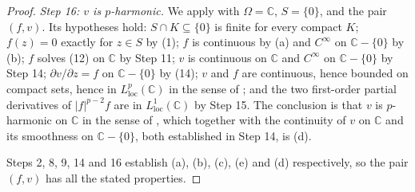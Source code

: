 \begin{proof}
\emph{Step 16: $v$ is $p$-harmonic.}  We apply 
with $\Omega=\mathbb{C}$, $S=\{0\}$, and the pair $(f,v)$.  Its hypotheses hold:
$S\cap K\subseteq\{0\}$ is finite for every compact $K$; $f(z)=0$ exactly for
$z\in S$ by (1); $f$ is continuous by (a) and $C^\infty$ on
$\mathbb{C}-\{0\}$ by (b); $f$ solves (12) on $\mathbb{C}$ by Step 11; $v$ is
continuous on $\mathbb{C}$ and $C^\infty$ on $\mathbb{C}-\{0\}$ by Step 14;
$\partial v/\partial z=f$ on $\mathbb{C}-\{0\}$ by (14); $v$ and $f$ are
continuous, hence bounded on compact sets, hence in
$L^p_{\mathrm{loc}}(\mathbb{C})$ in the sense of ; and the
two first-order partial derivatives of $|f|^{p-2}f$ are in
$L^1_{\mathrm{loc}}(\mathbb{C})$ by Step 15.  The conclusion is that $v$ is
$p$-harmonic on $\mathbb{C}$ in the sense of , which
together with the continuity of $v$ on $\mathbb{C}$ and its smoothness on
$\mathbb{C}-\{0\}$, both established in Step 14, is (d).

Steps 2, 8, 9, 14 and 16 establish (a), (b), (c), (e) and (d) respectively, so
the pair $(f,v)$ has all the stated properties.
\end{proof}
